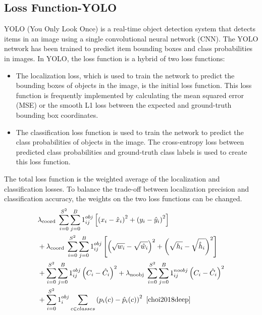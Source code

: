 \documentclass[11pt, a4paper, openany]{book}
\begin{document}
\subsection{Loss Function-YOLO}
YOLO (You Only Look Once) is a real-time object detection system that detects items in an image using a single convolutional neural network (CNN). The YOLO network has been trained to predict item bounding boxes and class probabilities in images. In YOLO, the loss function is a hybrid of two loss functions:~\cite{zhang2012automatic}
\begin{itemize}
\item The localization loss, which is used to train the network to predict the bounding boxes of objects in the image, is the initial loss function. This loss function is frequently implemented by calculating the mean squared error (MSE) or the smooth L1 loss between the expected and ground-truth bounding box coordinates.
\item The classification loss function is used to train the network to predict the class probabilities of objects in the image. The cross-entropy loss between predicted class probabilities and ground-truth class labels is used to create this loss function.
\end{itemize}
The total loss function is the weighted average of the localization and classification losses. To balance the trade-off between localization precision and classification accuracy, the weights on the two loss functions can be changed.
\begin{equation}
\begin{aligned}
& \lambda_{\text {coord }} \sum_{i=0}^{S^2} \sum_{j=0}^B 1_{i j}^{o b j}\left[\left(x_i-\hat{x}_i\right)^2+\left(y_i-\hat{y}_i\right)^2\right] \\
& +\lambda_{\text {coord }} \sum_{i=0}^{S^2} \sum_{j=0}^B 1_{i j}^{o b j}\left[\left(\sqrt{w_i}-\sqrt{\hat{w}_i}\right)^2+\left(\sqrt{h_i}-\sqrt{\hat{h}_i}\right)^2\right] \\
& +\sum_{i=0}^{S^2} \sum_{j=0}^B 1_{i j}^{o b j}\left(C_i-\hat{C}_i\right)^2+\lambda_{\text {noobj }} \sum_{i=0}^{S^2} \sum_{j=0}^B 1_{i j}^{n o o b j}\left(C_i-\hat{C}_i\right)^2 \\
& +\sum_{i=0}^{S^2} 1_i^{o b j} \sum_{c \in c l a s s e s}\left(p_i(c)-\hat{p}_i(c)\right)^2~ \cite{choi2018deep}
\end{aligned}
\end{equation}
\end{document}
